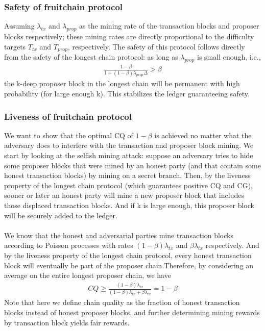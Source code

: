 \documentclass{report}
\begin{document}
\subsubsection{Safety of fruitchain protocol}
Assuming $\lambda_{tx}$ and $\lambda_{prop}$ as the mining rate of the transaction blocks and proposer blocks respectively;
these mining rates are directly proportional to the difficulty targets $T_{tx}$ and $T_{prop}$, respectively.
The safety of this protocol follows directly from the safety of the longest chain protocol: as long as
$\lambda_{prop}$ is small enough, i.e.,
\begin{align*}
	\frac{1-\beta}{1+(1-\beta)\lambda_{prop}\Delta} > \beta
\end{align*}
the k-deep proposer block in the longest chain will be permanent with high probability (for large
enough k). This stabilizes the ledger guaranteeing safety.
\subsubsection{Liveness of fruitchain protocol}
We want to show that the optimal CQ of $1 − \beta$ is achieved no matter what the adversary does to interfere with the transaction and proposer block mining. We start by looking at the selfish mining attack: suppose an adversary tries to hide some proposer blocks that were mined by an honest party (and that contain some honest transaction blocks) by mining on a secret branch. Then, by the liveness property of the longest chain protocol (which guarantees positive CQ and CG), sooner or later an honest party will mine a new proposer block that includes those displaced transaction blocks. And if k is large enough, this proposer block will be securely added to the ledger.\\\\
We know that the honest and adversarial parties mine transaction blocks according to Poisson processes with rates $(1 − \beta)\lambda_{tx}$ and $\beta\lambda_{tx}$ respectively. And by the liveness property of the longest chain protocol, every honest transaction block will eventually be part of the proposer chain.Therefore, by considering an average on the entire longest proposer chain, we have
\begin{align*}
	CQ \ge \frac{(1-\beta)\lambda_{tx}}{(1-\beta)\lambda_{tx} + \beta\lambda_{tx}} = 1 - \beta
\end{align*}
Note that here we define chain quality as the fraction of honest transaction blocks instead of honest proposer blocks, and further determining mining rewards by transaction block yields fair rewards.
\end{document}
